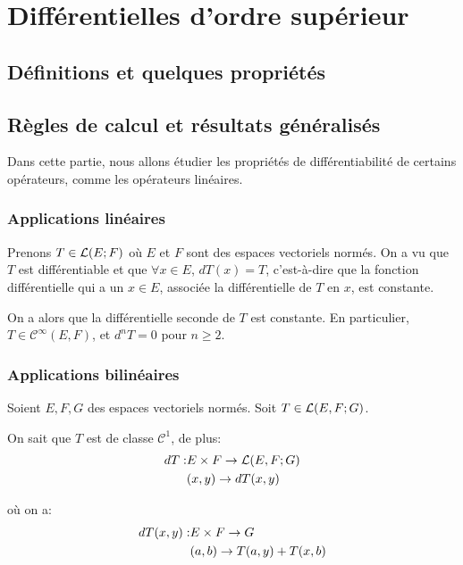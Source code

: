 \section{Différentielles d'ordre supérieur}

\subsection{Définitions et quelques propriétés}

\subsection{Règles de calcul et résultats généralisés}

Dans cette partie, nous allons étudier les propriétés de différentiabilité de
certains opérateurs, comme les opérateurs linéaires.

\subsubsection{Applications linéaires}

Prenons $T \in \mathcal{L}(E; F)$ où $E$ et $F$ sont des espaces vectoriels
normés.
On a vu que $T$ est différentiable et que $\forall x \in E$, $dT(x) = T$,
c'est-à-dire que la fonction différentielle qui a un $x \in E$, associée la
différentielle de $T$ en $x$, est constante.

On a alors que la différentielle seconde de $T$ est constante. En particulier,
$T \in \mathcal{C}^{\infty}(E, F)$, et $d^{n}T = 0$ pour $n \geq 2$.

\subsubsection{Applications bilinéaires}

Soient $E, F, G$ des espaces vectoriels normés.
Soit $T \in \mathcal{L}(E, F; G)$.

On sait que $T$ est de classe $\mathcal{C}^{1}$, de plus:
\begin{align*}
	dT : & E \times F \rightarrow \mathcal{L}(E, F; G) \\
	& (x, y) \rightarrow dT(x, y)
\end{align*}

où on a:
\begin{align*}
	dT(x, y) : & E \times F \rightarrow G \\
	& (a, b) \rightarrow T(a, y) + T(x, b)
\end{align*}

